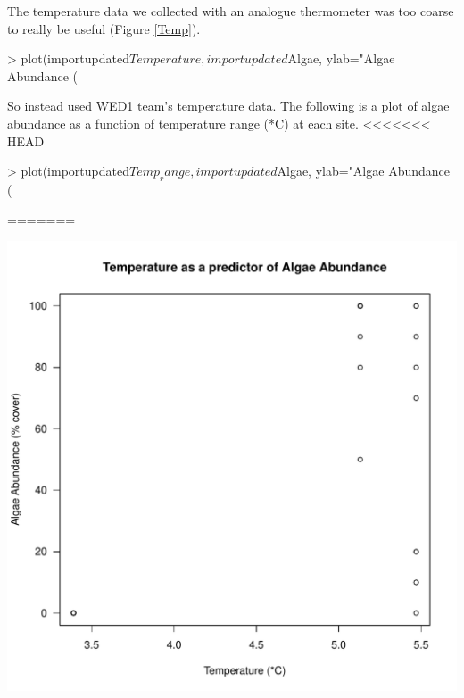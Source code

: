 \documentclass{article}
\begin{document}
The temperature data we collected with an analogue thermometer was too coarse to really be useful (Figure \ref{Temp}).
\begin{Schunk}
\begin{Sinput}
> plot(importupdated$Temperature,importupdated$Algae, ylab="Algae Abundance (%
\end{Sinput}
\end{Schunk}
So instead used WED1 team's temperature data. The following is a plot of algae abundance as a function of temperature range (*C) at each site. 
<<<<<<< HEAD
\begin{Schunk}
\begin{Sinput}
> plot(importupdated$Temp_range,importupdated$Algae, ylab="Algae Abundance (%
\end{Sinput}
\end{Schunk}
=======
\begin{knitrout}
\color{fgcolor}
\includegraphics[width=\maxwidth]{figure/unnamed-chunk-3-1} 

\end{knitrout}
\end{document}
